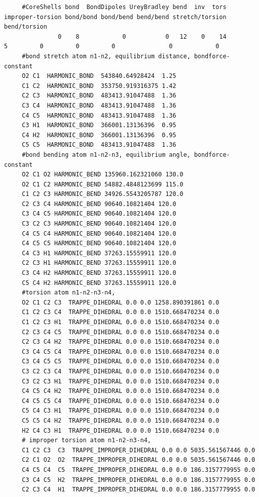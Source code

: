 \begin{tiny}
\begin{verbatim}
     #CoreShells bond  BondDipoles UreyBradley bend  inv  tors improper-torsion bond/bond bond/bend bend/bend stretch/torsion bend/torsion
               0    8            0           0   12    0    14                5         0         0         0               0            0
     #bond stretch atom n1-n2, equilibrium distance, bondforce-constant
     O2 C1  HARMONIC_BOND  543840.64928424  1.25
     C1 C2  HARMONIC_BOND  353750.919316375 1.42
     C2 C3  HARMONIC_BOND  483413.91047488  1.36
     C3 C4  HARMONIC_BOND  483413.91047488  1.36
     C4 C5  HARMONIC_BOND  483413.91047488  1.36
     C3 H1  HARMONIC_BOND  366001.13136396  0.95
     C4 H2  HARMONIC_BOND  366001.13136396  0.95
     C5 C5  HARMONIC_BOND  483413.91047488  1.36
     #bond bending atom n1-n2-n3, equilibrium angle, bondforce-constant
     O2 C1 O2 HARMONIC_BEND 135960.162321060 130.0
     O2 C1 C2 HARMONIC_BEND 54882.4848123699 115.0
     C1 C2 C3 HARMONIC_BEND 34926.5543205787 120.0
     C2 C3 C4 HARMONIC_BEND 90640.10821404 120.0
     C3 C4 C5 HARMONIC_BEND 90640.10821404 120.0
     C3 C2 C3 HARMONIC_BEND 90640.10821404 120.0
     C4 C5 C4 HARMONIC_BEND 90640.10821404 120.0
     C4 C5 C5 HARMONIC_BEND 90640.10821404 120.0
     C4 C3 H1 HARMONIC_BEND 37263.15559911 120.0
     C2 C3 H1 HARMONIC_BEND 37263.15559911 120.0
     C3 C4 H2 HARMONIC_BEND 37263.15559911 120.0
     C5 C4 H2 HARMONIC_BEND 37263.15559911 120.0
     #torsion atom n1-n2-n3-n4,
     O2 C1 C2 C3  TRAPPE_DIHEDRAL 0.0 0.0 1258.890391861 0.0
     C1 C2 C3 C4  TRAPPE_DIHEDRAL 0.0 0.0 1510.668470234 0.0
     C1 C2 C3 H1  TRAPPE_DIHEDRAL 0.0 0.0 1510.668470234 0.0
     C2 C3 C4 C5  TRAPPE_DIHEDRAL 0.0 0.0 1510.668470234 0.0
     C2 C3 C4 H2  TRAPPE_DIHEDRAL 0.0 0.0 1510.668470234 0.0
     C3 C4 C5 C4  TRAPPE_DIHEDRAL 0.0 0.0 1510.668470234 0.0
     C3 C4 C5 C5  TRAPPE_DIHEDRAL 0.0 0.0 1510.668470234 0.0
     C3 C2 C3 C4  TRAPPE_DIHEDRAL 0.0 0.0 1510.668470234 0.0
     C3 C2 C3 H1  TRAPPE_DIHEDRAL 0.0 0.0 1510.668470234 0.0
     C4 C5 C4 H2  TRAPPE_DIHEDRAL 0.0 0.0 1510.668470234 0.0
     C4 C5 C5 C4  TRAPPE_DIHEDRAL 0.0 0.0 1510.668470234 0.0
     C5 C4 C3 H1  TRAPPE_DIHEDRAL 0.0 0.0 1510.668470234 0.0
     C5 C5 C4 H2  TRAPPE_DIHEDRAL 0.0 0.0 1510.668470234 0.0
     H2 C4 C3 H1  TRAPPE_DIHEDRAL 0.0 0.0 1510.668470234 0.0
     # improper torsion atom n1-n2-n3-n4,
     C1 C2 C3  C3  TRAPPE_IMPROPER_DIHEDRAL 0.0 0.0 5035.561567446 0.0
     C2 C1 O2  O2  TRAPPE_IMPROPER_DIHEDRAL 0.0 0.0 5035.561567446 0.0
     C4 C5 C4  C5  TRAPPE_IMPROPER_DIHEDRAL 0.0 0.0 186.3157779955 0.0
     C3 C4 C5  H2  TRAPPE_IMPROPER_DIHEDRAL 0.0 0.0 186.3157779955 0.0
     C2 C3 C4  H1  TRAPPE_IMPROPER_DIHEDRAL 0.0 0.0 186.3157779955 0.0
\end{verbatim}
\end{tiny}

